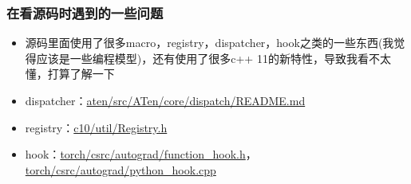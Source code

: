 \subsubsection{在看源码时遇到的一些问题}

\begin{itemize}
\item
  源码里面使用了很多macro，registry，dispatcher，hook之类的一些东西(我觉得应该是一些编程模型)，还有使用了很多c++
  11的新特性，导致我看不太懂，打算了解一下
\item
  dispatcher：\href{https://github.com/pytorch/pytorch/blob/master/aten/src/ATen/core/dispatch/README.md}{aten/src/ATen/core/dispatch/README.md}
\item
  registry：\href{https://github.com/pytorch/pytorch/blob/master/c10/util/Registry.h}{c10/util/Registry.h}
\item
  hook：\href{https://github.com/pytorch/pytorch/blob/master/torch/csrc/autograd/function_hook.h}{torch/csrc/autograd/function\_hook.h}，\href{https://github.com/pytorch/pytorch/blob/master/torch/csrc/autograd/python_hook.cpp}{torch/csrc/autograd/python\_hook.cpp}
\end{itemize}
